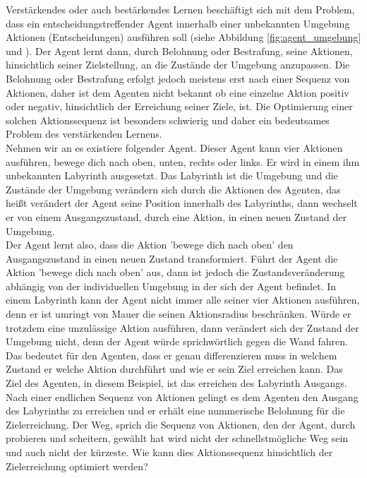 Verstärkendes oder auch bestärkendes Lernen beschäftigt sich mit dem Problem, dass ein entscheidungstreffender Agent innerhalb einer unbekannten Umgebung Aktionen (Entscheidungen) ausführen soll (siehe Abbildung \ref{fig:agent_umgebung} \cite[\acs{vgl.} 398]{Alpaydin} und \cite[\acs{vgl.} 290]{Ertel}). Der Agent lernt dann, durch Belohnung oder Bestrafung, seine Aktionen, hinsichtlich seiner Zielstellung, an die Zustände der Umgebung anzupassen. Die Belohnung oder Bestrafung erfolgt jedoch meistens erst nach einer Sequenz von Aktionen, daher ist dem Agenten nicht bekannt ob eine einzelne Aktion positiv oder negativ, hinsichtlich der Erreichung seiner Ziele, ist. Die Optimierung einer solchen Aktionssequenz ist besonders schwierig und daher ein bedeutsames Problem des verstärkenden Lernens.\\

Nehmen wir an es existiere folgender Agent. Dieser Agent kann vier Aktionen ausführen, bewege dich nach oben, unten, rechts oder links. Er wird in einem ihm unbekannten Labyrinth ausgesetzt. Das Labyrinth ist die Umgebung und die Zustände der Umgebung verändern sich durch die Aktionen des Agenten, das heißt verändert der Agent seine Position innerhalb des Labyrinths, dann wechselt er von einem Ausgangszustand, durch eine Aktion, in einen neuen Zustand der Umgebung. \\

Der Agent lernt also, dass die Aktion 'bewege dich nach oben' den Ausgangszustand in einen neuen Zustand transformiert. Führt der Agent die Aktion 'bewege dich nach oben' aus, dann ist jedoch die Zustandsveränderung abhängig von der individuellen Umgebung in der sich der Agent befindet. In einem Labyrinth kann der Agent nicht immer alle seiner vier Aktionen ausführen, denn er ist umringt von Mauer die seinen Aktionsradius beschränken. Würde er trotzdem eine unzulässige Aktion ausführen, dann verändert sich der Zustand der Umgebung nicht, denn der Agent würde sprichwörtlich gegen die Wand fahren. Das bedeutet für den Agenten, dass er genau differenzieren muss in welchem Zustand er welche Aktion durchführt und wie er sein Ziel erreichen kann. Das Ziel des Agenten, in diesem Beispiel, ist das erreichen des Labyrinth Ausgangs. \\

Nach einer endlichen Sequenz von Aktionen gelingt es dem Agenten den Ausgang des Labyrinths zu erreichen und er erhält eine nummerische Belohnung für die Zielerreichung. Der Weg, sprich die Sequenz von Aktionen, den der Agent, durch probieren und scheitern, gewählt hat wird nicht der schnellstmögliche Weg sein und auch nicht der kürzeste. Wie kann dies Aktionssequenz hinsichtlich der Zielerreichung optimiert werden? \\

